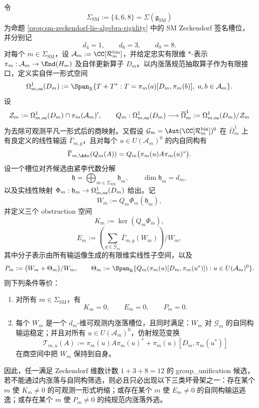 \begin{theorem}\label{distill:connes_spectral_triples_and_chamseddine_connes_spectral_action-inner_fluctuation_gauge_family-sm-zeckendorf-inner-fluctuation-bad-skeleton-trichotomy}
令
\[
\Sigma_{\mathrm{SM}}:=\{4,6,8\}=\Sigma(\mathfrak g_{\mathrm{SM}})
\]
为命题 \ref{prop:sm-zeckendorf-lie-algebra-rigidity} 中的 SM Zeckendorf 签名槽位，并分别记
\[
d_4=1,\qquad d_6=3,\qquad d_8=8.
\]
对每个 \(m\in\Sigma_{\mathrm{SM}}\)，设
\(\mathcal A_m:=\CC[\mathcal R_m^{\mathrm{bin}}]\)，并给定忠实有限维 \(\ast\)-表示
\(\pi_m:\mathcal A_m\to\End(H_m)\) 及自伴更新算子 \(D_m\)。以内涨落规范抽取算子作为有限接口，定义实自伴一形式空间
\[
\Omega^1_{m,{\rm sa}}(D_m):=\Span_{\mathbb R}\{T+T^*:T=\pi_m(a)[D_m,\pi_m(b)],\ a,b\in\mathcal A_m\}.
\]
设
\[
\mathcal Z_m:=\Omega^1_{m,{\rm sa}}(D_m)\cap \pi_m(\mathcal A_m)',
\qquad
Q_m:\Omega^1_{m,{\rm sa}}(D_m)\longrightarrow
\overline\Omega^1_m:=\Omega^1_{m,{\rm sa}}(D_m)/\mathcal Z_m
\]
为去除可观测平凡一形式后的商映射。又假设 \(\mathcal G_m=\Aut(\CC[\mathcal R_m^{\mathrm{bin}}])^0\) 在 \(\overline\Omega^1_m\) 上有良定义的线性输运 \(\overline\Gamma_{m,g}\)，且对每个 \(u\in U(\mathcal A_m)^0\) 的内自同构有
\[
\overline\Gamma_{m,\Ad u}(Q_m(A))=Q_m\bigl(\pi_m(u)A\pi_m(u)^*\bigr).
\]
设一个槽位对齐候选由紧李代数分解
\[
\mathfrak h=\bigoplus_{m\in\Sigma_{\mathrm{SM}}}\mathfrak h_m,\qquad
\dim\mathfrak h_m=d_m,
\]
以及实线性映射
\(\Phi_m:\mathfrak h_m\to\Omega^1_{m,{\rm sa}}(D_m)\) 给出。记
\[
W_m:=Q_m\Phi_m(\mathfrak h_m),
\]
并定义三个 obstruction 空间
\[
K_m:=\ker(Q_m\Phi_m),
\]
\[
E_m:=\left(\sum_{g\in\mathcal G_m}\overline\Gamma_{m,g}(W_m)\right)/W_m,
\]
其中分子表示由所有输运像生成的有限维实线性子空间，以及
\[
P_m:=\bigl(W_m+\Theta_m\bigr)/W_m,\qquad
\Theta_m:=\Span_{\mathbb R}\{Q_m(\pi_m(u)[D_m,\pi_m(u^*)]):u\in U(\mathcal A_m)^0\}.
\]
则下列条件等价：
\begin{enumerate}
  \item 对所有 \(m\in\Sigma_{\mathrm{SM}}\)，有
  \[
  K_m=0,\qquad E_m=0,\qquad P_m=0.
  \]
  \item 每个 \(W_m\) 是一个 \(d_m\)-维可观测内涨落槽位，且同时满足：\(W_m\) 对 \(\mathcal G_m\) 的自同构输运稳定；并且对所有 \(u\in U(\mathcal A_m)^0\)，仿射规范变换
  \[
  \mathcal T_{m,u}(A):=\pi_m(u)A\pi_m(u)^*+\pi_m(u)[D_m,\pi_m(u^*)]
  \]
  在商空间中把 \(W_m\) 保持到自身。
\end{enumerate}
因此，任一满足 Zeckendorf 维数计数 \(1+3+8=12\) 的 group\_unification 候选，若不能通过内涨落与自同构筛选，则必且只必出现以下三类坏骨架之一：存在某个 \(m\) 使 \(K_m\ne0\) 的可观测一形式坍缩；或存在某个 \(m\) 使 \(E_m\ne0\) 的自同构输运逃逸；或存在某个 \(m\) 使 \(P_m\ne0\) 的纯规范内涨落外逃。
\end{theorem}
